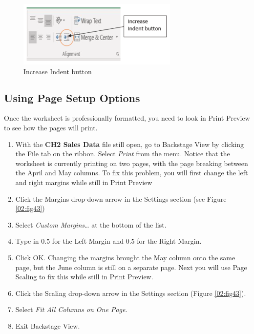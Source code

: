 \begin{figure}[H]
	\centering
	\includegraphics[width=\maxwidth{.95\linewidth}]{gfx/ch02_fig42}
	\caption{Increase Indent button}
	\label{02:fig42}
\end{figure}

\subsection{Using Page Setup Options}

Once the worksheet is professionally formatted, you need to look in Print Preview to see how the pages will print.

\begin{enumerate}
	\item With the \textbf{CH2 Sales Data} file still open, go to Backstage View by clicking the File tab on the ribbon. Select \textit{Print} from the menu. Notice that the worksheet is currently printing on two pages, with the page breaking between the April and May columns. To fix this problem, you will first change the left and right margins while still in Print Preview
	\item Click the Margins drop-down arrow in the Settings section (see Figure \ref{02:fig43})
	\item Select \textit{Custom Margins…} at the bottom of the list.
	\item Type in $ 0.5 $ for the Left Margin and $ 0.5 $ for the Right Margin.
	\item Click OK. Changing the margins brought the May column onto the same page, but the June column is still on a separate page. Next you will use Page Scaling to fix this while still in Print Preview.
	\item Click the Scaling drop-down arrow in the Settings section (Figure \ref{02:fig43}).
	\item Select \textit{Fit All Columns on One Page}.
	\item Exit Backstage View.
\end{enumerate}

